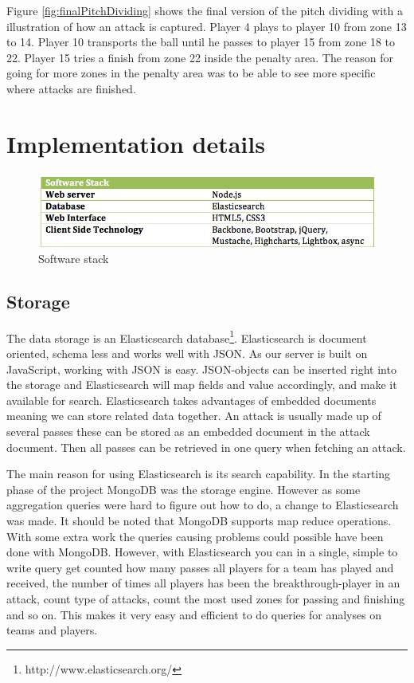 Figure \ref{fig:finalPitchDividing} shows the final version of the pitch dividing with a illustration of how an attack is captured. Player 4 plays to player 10 from zone 13 to 14. Player 10 transports the ball until he passes to player 15 from zone 18 to 22. Player 15 tries a finish from zone 22 inside the penalty area. The reason for going for more zones in the penalty area was to be able to see more specific where attacks are finished.

\section{Implementation details}

\begin{figure}[ht!]
\centering
\includegraphics[width=1\textwidth]{images/implementation/software_stack.png}
\caption{Software stack}
\end{figure}

\subsection{Storage}

The data storage is an Elasticsearch database\footnote{http://www.elasticsearch.org/}. Elasticsearch is document oriented, schema less and works well with \ac{JSON}\footnotemark. As our server is built on JavaScript, working with \ac{JSON} is easy. \ac{JSON}-objects can be inserted right into the storage and Elasticsearch will map fields and value accordingly, and make it available for search.
Elasticsearch takes advantages of embedded documents meaning we can store related data together. An attack is usually made up of several passes these can be stored as an embedded document in the attack document. Then all passes can be retrieved in one query when fetching an attack.

The main reason for using Elasticsearch is its search capability. In the starting phase of the project MongoDB \footnotemark was the storage engine. However as some aggregation queries were hard to figure out how to do, a change to Elasticsearch was made. It should be noted that MongoDB supports map reduce operations. With some extra work the queries causing problems could possible have been done with MongoDB. However, with Elasticsearch you can in a single, simple to write query get counted how many passes all players for a team has played and received, the number of times all players has been the breakthrough-player in an attack, count type of attacks, count the most used zones for passing and finishing and so on. This makes it very easy and efficient to do queries for analyses on teams and players.

